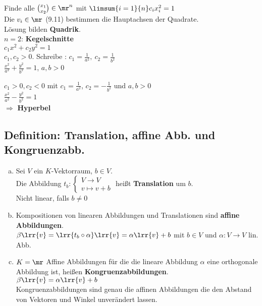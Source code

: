 	Finde alle $ \binom{x_1} {x_2}\in\mr^n $ mit $ \limsum{i=1}{n}c_ix_i^2=1 $\\
	Die $ v_i\in\mr $ (9.11) bestimmen die Hauptachsen der Quadrate.\\
	Lösung bilden \textbf{Quadrik}.\\
	$ n=2 $: \textbf{Kegelschnitte}\\
	$ c_1x^2+c_2y^2=1 $\\
	$c_1,c_2>0$. Schreibe : $ c_1=\frac{1}{a^2},\ c_2=\frac{1}{b^2} $\\
	$ \frac{x^2}{a^2}+\frac{y^2}{b^2}=1 $, $ a,b>0 $

	$c_1>0, c_2<0$ mit $c_1=\frac{1}{a^2}$, $c_2=-\frac{1}{b^2}$ und $a,b>0$\\
	$\frac{x^2}{a^2}-\frac{y^2}{b^2}=1$\\
	$\Rightarrow$ \textbf{Hyperbel}

\subsection{Definition: Translation, affine Abb. und Kongruenzabb.}
	\begin{enumerate}[a)]
		\item Sei $V$ ein $K$-Vektorraum, $b\in V$.\\
			Die Abbildung $t_b:\begin{cases}V\rightarrow V\\v\mapsto v+b\end{cases}$ heißt \textbf{Translation} um $b$.\\
			Nicht linear, falls $b\neq 0$
		\item Kompositionen von linearen Abbildungen und Translationen sind \textbf{affine Abbildungen}.\\
			$\beta\lrr{v}=\lrr{t_b\circ\alpha}\lrr{v}=\alpha\lrr{v}+b$ mit $b\in V$ und $\alpha:V\rightarrow V$ lin. Abb.
		\item $K=\mr$ Affine Abbildungen für die die lineare Abbildung $\alpha$ eine orthogonale Abbildung ist, heißen \textbf{Kongruenzabbildungen}.\\
			$\beta\lrr{v}=\alpha\lrr{v}+b$\\
			Kongruenzabbildungen sind genau die affinen Abbildungen die den Abstand von Vektoren und Winkel unverändert lassen.
	\end{enumerate}
	
